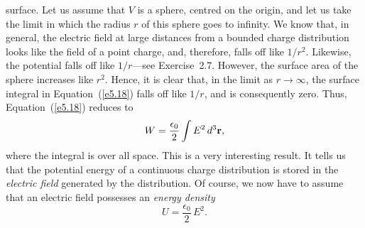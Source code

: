 surface. Let us assume that $V$ is a sphere, centred on the origin, and let
us take the limit in which the radius $r$  of this sphere goes  to infinity.
We know that, in general, the electric field at large distances from a
bounded charge
distribution looks  like the field of a point charge, and, therefore,
falls off like $1/r^2$. Likewise, the potential falls off like $1/r$---see Exercise~2.7. However,
the surface area of the sphere increases like $r^2$. Hence, it is clear that, in the
limit as $r\rightarrow \infty$, the surface integral in Equation~(\ref{e5.18}) falls off
like $1/r$, and is consequently zero. 
 Thus, Equation~(\ref{e5.18}) reduces to
\begin{equation}\label{e5.19}
W = \frac{\epsilon_0}{2} \int E^2\,d^3{\bf r},
\end{equation}
where the integral is over all space. This is a very interesting
result. It tells us that the potential energy of a continuous charge
distribution is stored in the {\em electric field}\/ generated by the distribution. Of course, we now have to assume that
an electric field possesses an {\em energy density}
\begin{equation}\label{eeu}
U  = \frac{\epsilon_0}{2} \,E^2.
\end{equation}


